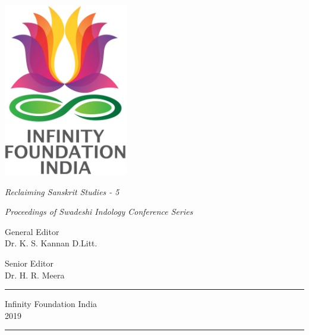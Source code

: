 \thispagestyle{empty}
\begin{center}
\includegraphics[scale=0.3]{images/logo.png}
\bigskip

{\fontsize{10}{14}\selectfont\sl
Reclaiming Sanskrit Studies - 5
}

\bigskip
\end{center}
\medskip

\begin{center}
{\fontsize{20}{24}\selectfont {S\,W\,A\,D\,E\,S\,H\,I\;\; C\,R\,I\,T\,I\,Q\,U\,E}}

\medskip

{\fontsize{20}{24}\selectfont {of}}

\medskip

{\fontsize{20}{24}\selectfont {V\,I\,D\,E\,S\,H\,I\;\; M\,Ī\,M\,Ā\,Ṁ\,S\,Ā}}
\bigskip

{\sl\small Proceedings of Swadeshi Indology Conference Series}
\vfill


{\fontsize{14}{18}\selectfont 
General Editor\\[2pt]
Dr. K. S. Kannan} {\small D.Litt.}\par 

\bigskip
 
{\fontsize{14}{18}\selectfont 
Senior Editor\\[2pt]
Dr. H. R. Meera}\par
\vfill

\rule{5cm}{1pt}

{\fontsize{12}{14}\selectfont
Infinity Foundation India\\[4pt]
2019}

\rule{5cm}{1pt}
\end{center}




